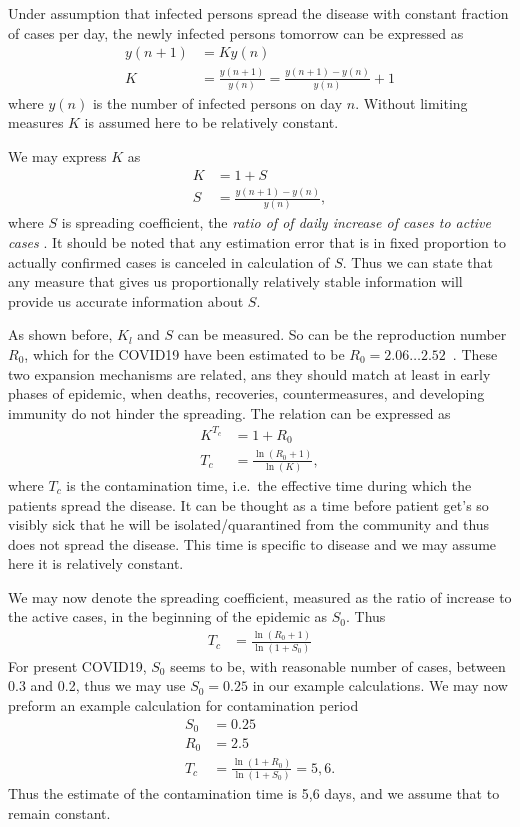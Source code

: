 Under assumption that infected persons spread the disease with constant
fraction of cases per day, the newly infected persons tomorrow can be
expressed as
\begin{align}
    y\left(n+1\right)&=K y\left(n\right)\\
    K&= \frac{y\left(n+1\right)}{y\left(n\right)}=
    \frac{y\left(n+1\right)-y\left(n\right)}{y\left(n\right)}+1
\end{align}
where $y\left(n\right)$ is the number of infected persons on day $n$. Without
limiting measures $K$ is assumed here to be relatively constant. 

We may express $K$ as
\begin{align}
    K&= 1+S\\
    S &= \frac{y\left(n+1\right)-y\left(n\right)}{y\left(n\right)},
\end{align}
where $S$ is spreading coefficient, the \emph{ ratio of of daily increase of
    cases  to
active cases }. It should be noted that any estimation error that is in fixed
proportion to actually confirmed cases is canceled in calculation of $S$. Thus
we can state that any measure that gives us proportionally relatively stable
information will provide us accurate information about $S$.

As shown before, $K_l$ and $S$ can be measured. So can be the reproduction
number $R_0$, which for the COVID19 have been estimated to be $R_0=2.06 \ldots
2.52$~\cite{Zhang_S2020}.
These two expansion mechanisms are related, ans they should match at least in early phases of
epidemic, when deaths, recoveries, countermeasures, and developing immunity do not hinder the
spreading. The relation can be expressed as 
\begin{align}
    K^{T_c}&= 1+R_0\\
    T_c&=\frac{\ln\left(R_0+1\right)}{\ln\left(K\right)},
\end{align}
where $T_c$ is the contamination time, i.e.\ the effective time during which the patients
spread the disease. It can be thought as a time before patient get's so
visibly sick that he will be isolated/quarantined from the community and thus
does not spread the disease. This time is specific to disease and we may
assume here it is relatively constant.

We may now denote the spreading coefficient, measured as the ratio of increase
to the active cases, in the beginning of the epidemic as $S_0$. Thus
\begin{align}
    T_c&=\frac{\ln\left(R_0+1\right)}{\ln\left(1+S_0\right)}
\end{align}
For present COVID19, $S_0$ seems to be, with reasonable number of cases,
between 0.3 and 0.2, thus we may use $S_0=0.25$ in our example
calculations. We may now preform an example calculation for contamination
period 
\begin{align}
    S_0&=0.25\\
    R_0&=2.5\\
    T_c&=\frac{\ln\left(1+R_0\right)}{\ln\left(1+S_0\right)}=5,6.
\end{align}
Thus the estimate of the contamination time is 5,6 days, and we assume that to
remain constant.

